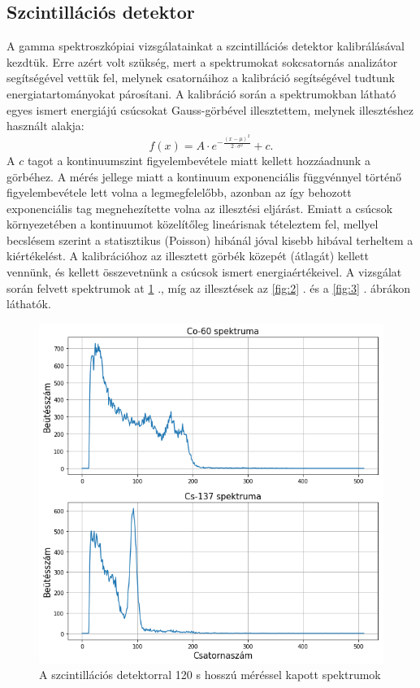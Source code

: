 \documentclass[12pt,a4paper]{article}
\begin{document}
\subsection{Szcintillációs detektor}
\hspace*{10pt} A gamma spektroszkópiai vizsgálatainkat a szcintillációs detektor kalibrálásával kezdtük. Erre azért volt szükség, mert a spektrumokat sokcsatornás analizátor segítségével vettük fel, melynek csatornáihoz a kalibráció segítségével tudtunk energiatartományokat párosítani. A kalibráció során a spektrumokban látható egyes ismert energiájú csúcsokat Gauss-görbével illesztettem, melynek illesztéshez használt alakja:
$$f(x)=A\cdot e^{-\frac{(x-\mu)^2}{2\cdot \sigma ^2}} + c  .$$
A $c$ tagot a kontinuumszint figyelembevétele miatt kellett hozzáadnunk a görbéhez. A mérés jellege miatt a kontinuum exponenciális függvénnyel történő figyelembevétele lett volna a legmegfelelőbb, azonban az így behozott exponenciális tag megnehezítette volna az illesztési eljárást. Emiatt a csúcsok környezetében a kontinuumot közelítőleg lineárisnak tételeztem fel, mellyel becslésem szerint a statisztikus (Poisson) hibánál jóval kisebb hibával terheltem a kiértékelést. A kalibrációhoz az illesztett görbék közepét (átlagát) kellett vennünk, és kellett összevetnünk a csúcsok ismert energiaértékeivel. A vizsgálat során felvett spektrumok at \ref{fig:1} ., míg az illesztések az \ref{fig:2} . és a \ref{fig:3} . ábrákon láthatók.\\
\begin{figure}[!h]
\centering
\includegraphics[scale=0.53]{szc_spekt}
\caption{A szcintillációs detektorral 120 s hosszú méréssel kapott spektrumok}
\label{fig:1}
\end{figure}
\end{document}
